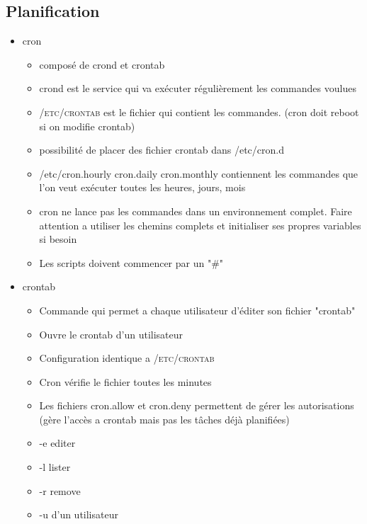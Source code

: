\documentclass[a4paper]{article}
\begin{document}
      \subsection{Planification}
      \begin{itemize}[label = \textbullet, font = \Large]
        \item cron
        \begin{itemize}[label=, font=\scriptsize] 
          \item composé de crond et crontab
          \item crond est le service qui va exécuter régulièrement les commandes voulues
          \item \textsc{/etc/crontab} est le fichier qui contient les commandes. (cron doit reboot si on modifie crontab)
          \item possibilité de placer des fichier crontab dans /etc/cron.d
          \item /etc/cron.hourly cron.daily cron.monthly contiennent les commandes que l’on veut exécuter toutes les heures, jours, mois
          \item cron ne lance pas les commandes dans un environnement complet. Faire attention a utiliser les chemins complets et initialiser ses propres variables si besoin
          \item Les scripts doivent commencer par un "\#"     
        \end{itemize}
        \item crontab
        \begin{itemize}[label=, font=\scriptsize] 
          \item Commande qui permet a chaque utilisateur d'éditer son fichier "crontab"
          \item Ouvre le crontab d'un utilisateur
          \item Configuration identique a \textsc{/etc/crontab}
          \item Cron vérifie le fichier toutes les minutes
          \item Les fichiers cron.allow et cron.deny permettent de gérer les autorisations (gère l'accès a crontab mais pas les tâches déjà planifiées)
          \item -e editer
          \item -l lister
          \item -r remove
          \item -u d'un utilisateur
        \end{itemize}

\end{itemize}
\end{document}
